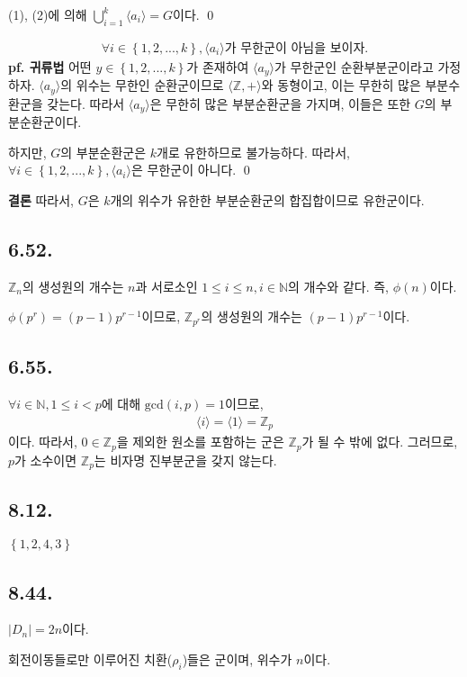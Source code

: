 \documentclass{article}
\begin{document}
(1), (2)에 의해 $\bigcup_{i=1}^{k} {\langle a_i \rangle} = G$이다. \qed

\begin{align*}
\forall i \in \left\{1, 2, ..., k\right\}, \langle a_i \rangle \text{가 무한군이 아님을 보이자.}
\end{align*}
\textbf{pf. 귀류법} 어떤 $y \in \left\{1, 2, ..., k\right\}$가 존재하여 $\langle a_y \rangle$가 무한군인 순환부분군이라고 가정하자. $\langle a_y \rangle$의 위수는 무한인 순환군이므로 $\langle \mathbb{Z}, + \rangle$와 동형이고, 이는 무한히 많은 부분수환군을 갖는다. 따라서 $\langle a_y \rangle$은 무한히 많은 부분순환군을 가지며, 이들은 또한 $G$의 부분순환군이다.

하지만, $G$의 부분순환군은 $k$개로 유한하므로 불가능하다. 따라서, $\forall i \in \left\{1, 2, ..., k\right\}, \langle a_i \rangle$은 무한군이 아니다. \qed

\textbf{결론} 따라서, $G$은 $k$개의 위수가 유한한 부분순환군의 합집합이므로 유한군이다.

\subsection{6.52.}
$\mathbb{Z}_n$의 생성원의 개수는 $n$과 서로소인 $1 \le i \le n, i \in \mathbb{N}$의 개수와 같다. 즉, $\phi(n)$이다.

$\phi(p^r) = (p-1) p^{r-1}$이므로, $\mathbb{Z}_{p^r}$의 생성원의 개수는 $(p-1) p^{r-1}$이다.

\subsection{6.55.}
$\forall i \in \mathbb{N}, 1 \le i < p$에 대해 $\text{gcd}(i, p) = 1$이므로, 
\begin{align*}
\langle i \rangle = \langle 1 \rangle = \mathbb{Z}_p
\end{align*}
이다. 따라서, $0 \in \mathbb{Z}_p$을 제외한 원소를 포함하는 군은 $\mathbb{Z}_p$가 될 수 밖에 없다. 그러므로, $p$가 소수이면 $\mathbb{Z}_p$는 비자명 진부분군을 갖지 않는다. 
\subsection{8.12.}
$\left\{ 1, 2, 4, 3 \right\}$
\subsection{8.44.}
$\left|D_n \right| = 2n$이다. 

회전이동들로만 이루어진 치환($\rho_i$)들은 군이며, 위수가 $n$이다.
\end{document}
